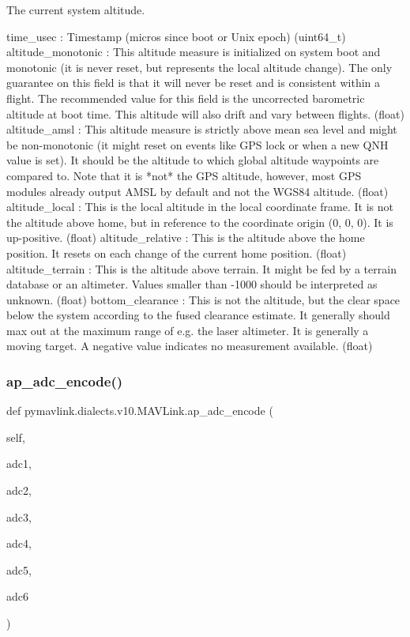 \begin{DoxyVerb}The current system altitude.

time_usec                 : Timestamp (micros since boot or Unix epoch) (uint64_t)
altitude_monotonic        : This altitude measure is initialized on system boot and monotonic (it is never reset, but represents the local altitude change). The only guarantee on this field is that it will never be reset and is consistent within a flight. The recommended value for this field is the uncorrected barometric altitude at boot time. This altitude will also drift and vary between flights. (float)
altitude_amsl             : This altitude measure is strictly above mean sea level and might be non-monotonic (it might reset on events like GPS lock or when a new QNH value is set). It should be the altitude to which global altitude waypoints are compared to. Note that it is *not* the GPS altitude, however, most GPS modules already output AMSL by default and not the WGS84 altitude. (float)
altitude_local            : This is the local altitude in the local coordinate frame. It is not the altitude above home, but in reference to the coordinate origin (0, 0, 0). It is up-positive. (float)
altitude_relative         : This is the altitude above the home position. It resets on each change of the current home position. (float)
altitude_terrain          : This is the altitude above terrain. It might be fed by a terrain database or an altimeter. Values smaller than -1000 should be interpreted as unknown. (float)
bottom_clearance          : This is not the altitude, but the clear space below the system according to the fused clearance estimate. It generally should max out at the maximum range of e.g. the laser altimeter. It is generally a moving target. A negative value indicates no measurement available. (float)\end{DoxyVerb}
 \mbox{\label{classpymavlink_1_1dialects_1_1v10_1_1MAVLink_ab1957fe0b14bfbdd98bec93a8e3f4a69}} 
\subsubsection{\texorpdfstring{ap\+\_\+adc\+\_\+encode()}{ap\_adc\_encode()}}
{\footnotesize\ttfamily def pymavlink.\+dialects.\+v10.\+M\+A\+V\+Link.\+ap\+\_\+adc\+\_\+encode (\begin{DoxyParamCaption}\item[{}]{self,  }\item[{}]{adc1,  }\item[{}]{adc2,  }\item[{}]{adc3,  }\item[{}]{adc4,  }\item[{}]{adc5,  }\item[{}]{adc6 }\end{DoxyParamCaption})}

